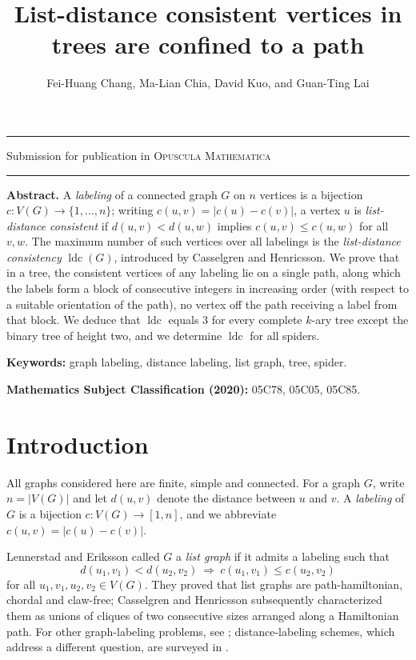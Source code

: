 \documentclass[reqno,10pt]{article}
\theoremstyle{definition}
\numberwithin{equation}{section}
\numberwithin{theorem}{section}
\newenvironment{OMabstract}{\noindent\textbf{Abstract.} }{\medskip}
\newenvironment{OMsubjclass}{\noindent\textbf{Mathematics Subject Classification (2020):} }{\medskip}
\newenvironment{OMkeywords}{\noindent\textbf{Keywords:} }{\medskip}
\newcommand{\ldc}{\operatorname{ldc}}
\begin{document}
\author{Fei-Huang Chang, Ma-Lian Chia, David Kuo, and Guan-Ting Lai}
\title{List-distance consistent vertices in trees are confined to a path}
\date{}
\maketitle

\hrule\smallskip
\begin{center}
Submission for publication in \textsc{Opuscula Mathematica}
\end{center}
\smallskip\hrule\bigskip

\begin{OMabstract}
A \emph{labeling} of a connected graph $G$ on $n$ vertices is a bijection
$c:V(G)\to\{1,\dots,n\}$; writing $c(u,v)=|c(u)-c(v)|$, a vertex $u$ is
\emph{list-distance consistent} if $d(u,v)<d(u,w)$ implies $c(u,v)\le c(u,w)$
for all $v,w$. The maximum number of such vertices over all labelings is the
\emph{list-distance consistency} $\ldc(G)$, introduced by Casselgren and
Henricsson. We prove that in a tree, the consistent vertices of any labeling lie on a single path, along which the labels form a block of consecutive integers in increasing order (with respect to a suitable orientation of the path), no vertex off the path receiving a label from that block. We deduce that $\ldc$ equals $3$ for every complete $k$-ary tree
except the binary tree of height two, and we determine $\ldc$ for all spiders.
\end{OMabstract}

\begin{OMkeywords}
graph labeling, distance labeling, list graph, tree, spider.
\end{OMkeywords}

\begin{OMsubjclass}
05C78, 05C05, 05C85.
\end{OMsubjclass}

\section{Introduction}
\label{sec:intro}

All graphs considered here are finite, simple and connected. For a graph $G$,
write $n=|V(G)|$ and let $d(u,v)$ denote the distance between $u$ and $v$. A
\emph{labeling} of $G$ is a bijection $c:V(G)\to[1,n]$, and we abbreviate
$c(u,v)=|c(u)-c(v)|$.

Lennerstad and Eriksson \cite{LE2018} called $G$ a \emph{list graph} if it
admits a labeling such that
\begin{equation}
 d(u_1,v_1)<d(u_2,v_2)\ \Longrightarrow\
 c(u_1,v_1)\le c(u_2,v_2)
 \label{eq:listcond}
\end{equation}
for all $u_1,v_1,u_2,v_2\in V(G)$. They proved that list graphs are
path-hamiltonian, chordal and claw-free; Casselgren and Henricsson \cite{CH2025}
subsequently characterized them as unions of cliques of two consecutive sizes
arranged along a Hamiltonian path. For other graph-labeling problems, see
\cite{Gallian}; distance-labeling schemes, which address a different question,
are surveyed in \cite{GPR}.
\end{document}
